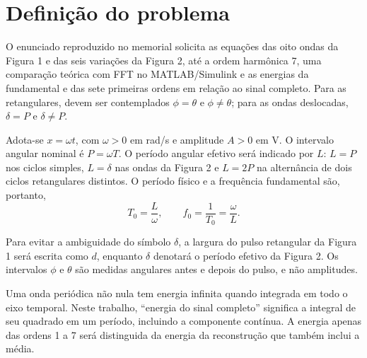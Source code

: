 \section{Definição do problema}

O enunciado reproduzido no memorial solicita as equações das oito ondas
da Figura 1 e das seis variações da Figura 2, até a ordem harmônica 7,
uma comparação teórica com FFT no MATLAB/Simulink e as energias da
fundamental e das sete primeiras ordens em relação ao sinal completo.
Para as retangulares, devem ser contemplados $\phi=\theta$ e
$\phi\neq\theta$; para as ondas deslocadas, $\delta=P$ e $\delta\neq P$.

Adota-se $x=\omega t$, com $\omega>0$ em rad/s e amplitude $A>0$ em V.
O intervalo angular nominal é $P=\omega T$. O período angular efetivo
será indicado por $L$: $L=P$ nos ciclos simples, $L=\delta$ nas ondas
da Figura 2 e $L=2P$ na alternância de dois ciclos retangulares distintos.
O período físico e a frequência fundamental são, portanto,
\begin{equation}
    T_0=\frac{L}{\omega}, \qquad f_0=\frac{1}{T_0}=\frac{\omega}{L}.
\end{equation}

Para evitar a ambiguidade do símbolo $\delta$, a largura do pulso
retangular da Figura 1 será escrita como $d$, enquanto $\delta$ denotará
o período efetivo da Figura 2. Os intervalos $\phi$ e $\theta$ são
medidas angulares antes e depois do pulso, e não amplitudes.

Uma onda periódica não nula tem energia infinita quando integrada em
todo o eixo temporal. Neste trabalho, ``energia do sinal completo''
significa a integral de seu quadrado em um período, incluindo a
componente contínua. A energia apenas das ordens 1 a 7 será distinguida
da energia da reconstrução que também inclui a média.
